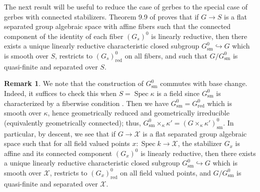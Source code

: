 \documentclass{amsart}
\theoremstyle{definition}
\newtheorem{remark}[remark]{Remark}
\newcommand{\cX}{\mathcal{X}}
\newcommand{\red}{\mathrm{red}}
\newcommand{\sm}{\mathrm{sm}}
\DeclareMathOperator{\Spec}{Spec}
\begin{document}
	
	
	The next result will be useful to reduce the case of gerbes to the special case of gerbes with connected stabilizers. Theorem 9.9 of \cite{AHRetalelocal} proves that if $G\to S$ is a flat separated group algebraic space with affine fibers such that the connected component of the identity of each fiber $(G_s)^0$ is linearly reductive, then there exists a unique linearly reductive characteristic closed subgroup $G^0_{\sm}\hookrightarrow G$ which is smooth over $S$, restricts to $(G_s)^0_{\mathrm{red}}$ on all fibers, and such that $G/G^0_{\sm}$ is quasi-finite and separated over $S$. 
	
	\begin{remark}\label{rmk:G0smoverX}
		We note that the construction of $G^0_{\sm}$ commutes with base change. Indeed, it suffices to check this   when $S=\Spec\kappa$ is a field since $G^0_{\sm}$ is characterized by a fiberwise condition \cite[Theorem 9.9]{AHRetalelocal}. 
		Then we have $G^0_{\sm}=G^0_{\red}$ which is smooth over 
		$\kappa$, hence geometrically reduced and geometrically irreducible (equivalently geometrically connected); thus, $G^0_{\sm}\times_\kappa \kappa'=(G\times_\kappa \kappa')^0_{\sm}$. 
		In particular, by descent, we see that if $G\to\cX$ is a flat separated group algebraic space such that for all field valued points $x\colon\Spec k\to\cX$, the stabilizer $G_x$ is affine and its connected component $(G_x)^0$ is linearly reductive, then there exists a unique linearly reductive characteristic closed subgroup $G^0_{\sm}\hookrightarrow G$ which is smooth over $\cX$, restricts to $(G_x)^0_{\mathrm{red}}$ on all field valued points, and $G/G^0_{\sm}$ is quasi-finite and separated over $\cX$.
	\end{remark}
	
	
	
	
	
\end{document}
